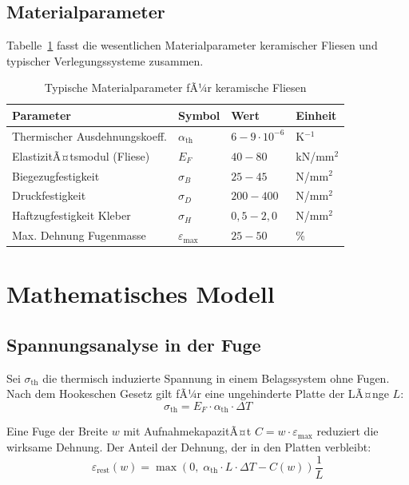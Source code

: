 ﻿\documentclass[a4paper,12pt]{article}
\theoremstyle{definition}
\begin{document}
\subsection{Materialparameter}

Tabelle~\ref{tab:parameter} fasst die wesentlichen Materialparameter
keramischer Fliesen und typischer Verlegungssysteme zusammen.

\begin{table}[h]
	\centering
	\caption{Typische Materialparameter fÃ¼r keramische Fliesen}
	\label{tab:parameter}
	\begin{tabular}{llll}
		\toprule
		Parameter & Symbol & Wert & Einheit \\
		\midrule
		Thermischer Ausdehnungskoeff. & $\alpha_{\text{th}}$ & $6{-}9 \cdot 10^{-6}$ & K$^{-1}$ \\
		ElastizitÃ¤tsmodul (Fliese) & $E_F$ & $40{-}80$ & kN/mm$^2$ \\
		Biegezugfestigkeit & $\sigma_B$ & $25{-}45$ & N/mm$^2$ \\
		Druckfestigkeit & $\sigma_D$ & $200{-}400$ & N/mm$^2$ \\
		Haftzugfestigkeit Kleber & $\sigma_H$ & $0{,}5{-}2{,}0$ & N/mm$^2$ \\
		Max. Dehnung Fugenmasse & $\varepsilon_{\max}$ & $25{-}50$ & \% \\
		\bottomrule
	\end{tabular}
\end{table}

\section{Mathematisches Modell}

\subsection{Spannungsanalyse in der Fuge}

Sei $\sigma_{\text{th}}$ die thermisch induzierte Spannung in einem
Belagssystem ohne Fugen. Nach dem Hookeschen Gesetz gilt fÃ¼r eine
ungehinderte Platte der LÃ¤nge $L$:
\[
\sigma_{\text{th}} = E_F \cdot \alpha_{\text{th}} \cdot \Delta T
\]

Eine Fuge der Breite $w$ mit AufnahmekapazitÃ¤t $C = w \cdot \varepsilon_{\max}$
reduziert die wirksame Dehnung. Der Anteil der Dehnung, der in den
Platten verbleibt:
\[
\varepsilon_{\text{rest}}(w) = \max\!\left(0,\;\alpha_{\text{th}} \cdot L \cdot \Delta T - C(w)\right)
\frac{1}{L}
\]
\end{document}
